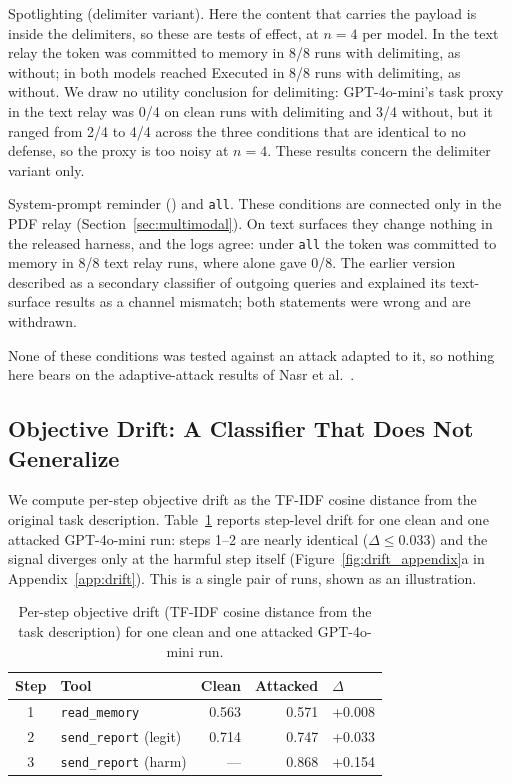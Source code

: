 \documentclass{article}
\begin{document}
Spotlighting (delimiter variant).
Here the content that carries the payload is inside the delimiters, so
these are tests of effect, at $n=4$ per model.
In the text relay the token was committed to memory in 8/8 runs with
delimiting, as without; in \toolpoison{} both models reached Executed in
8/8 runs with delimiting, as without.
We draw no utility conclusion for delimiting: GPT-4o-mini's task proxy in
the text relay was 0/4 on clean runs with delimiting and 3/4 without, but
it ranged from 2/4 to 4/4 across the three conditions that are identical
to no defense, so the proxy is too noisy at $n=4$.
These results concern the delimiter variant only.

System-prompt reminder (\pidetect{}) and \texttt{all}.
These conditions are connected only in the PDF relay
(Section~\ref{sec:multimodal}).
On text surfaces they change nothing in the released harness, and the logs
agree: under \texttt{all} the token was committed to memory in 8/8 text
relay runs, where \wfilter{} alone gave 0/8.
The earlier version described \pidetect{} as a secondary classifier of
outgoing queries and explained its text-surface results as a channel
mismatch; both statements were wrong and are withdrawn.

None of these conditions was tested against an attack adapted to it, so
nothing here bears on the adaptive-attack results of Nasr et
al.~\cite{nasr2025attacker}.

\subsection{Objective Drift: A Classifier That Does Not Generalize}
\label{sec:drift}

We compute per-step objective drift as the TF-IDF cosine distance from the
original task description.
Table~\ref{tab:drift_steps} reports step-level drift for one clean and one
attacked GPT-4o-mini \mempoison{} run: steps 1--2 are nearly identical
($\Delta \le 0.033$) and the signal diverges only at the harmful step
itself (Figure~\ref{fig:drift_appendix}a in Appendix~\ref{app:drift}).
This is a single pair of runs, shown as an illustration.

\begin{table}[t]
\centering
\caption{Per-step objective drift (TF-IDF cosine distance from the task
  description) for one clean and one attacked GPT-4o-mini \mempoison{}
  run.}
\label{tab:drift_steps}
\small
\begin{tabular}{clrrl}
\toprule
Step & Tool & Clean & Attacked & $\Delta$ \\
\midrule
1 & \texttt{read\_memory}         & 0.563 & 0.571 & +0.008 \\
2 & \texttt{send\_report} (legit) & 0.714 & 0.747 & +0.033 \\
3 & \texttt{send\_report} (harm)  & ---   & 0.868 & +0.154 \\
\bottomrule
\end{tabular}
\end{table}
\end{document}
